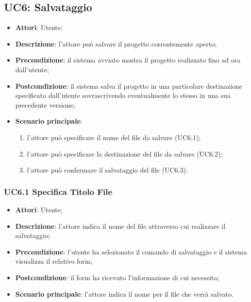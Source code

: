 \subsection{UC6: Salvataggio}
\label{UC6}
\begin{itemize}
	\item \textbf{Attori}: Utente;
	\item \textbf{Descrizione}: l'attore può salvare il progetto correntemente aperto;
	\item \textbf{Precondizione}: il sistema avviato mostra il progetto realizzato fino ad ora dall'utente;
	\item \textbf{Postcondizione}: il sistema salva il progetto in una particolare destinazione specificata dall'utente sovrascrivendo eventualmente lo stesso in una sua precedente versione;
	\item \textbf{Scenario principale}:
	\begin{enumerate}
		\item l'attore può specificare il nome del file da salvare (UC6.1);
		\item l'attore può specificare la destinazione del file da salvare (UC6.2);
		\item l'attore può confermare il salvataggio del file (UC6.3).
	\end{enumerate}
\end{itemize}

\subsubsection{UC6.1 Specifica Titolo File}
\label{UC6.1}
\begin{itemize}
	\item \textbf{Attori}: Utente;
	\item \textbf{Descrizione}: l'attore indica il nome del file attraverso cui realizzare il salvataggio;
	\item \textbf{Precondizione}: l'utente ha selezionato il comando di salvataggio e il sistema visualizza il relativo form;
	\item \textbf{Postcondizione}: il form ha ricevuto l'informazione di cui necessita;
	\item \textbf{Scenario principale}: l'attore indica il nome per il file che verrà salvato.
\end{itemize}

